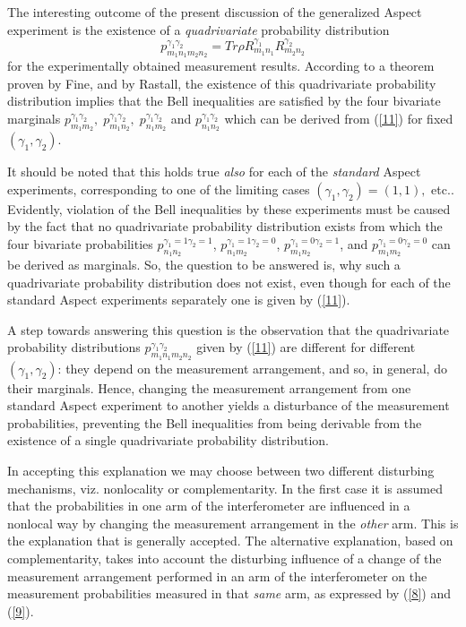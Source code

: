 \documentclass[12pt]{article}
\begin{document}
{The interesting outcome of the present discussion of the
generalized Aspect experiment is the existence of a
\textit{quadrivariate} probability distribution
 \begin{equation}\label{11}p^{\gamma_1\gamma_2}_{{m}_{\!1}
{n}_{\!1} {m}_{2} {n}_{2}} = Tr \rho R^{\gamma_1}_{{m}_{\!1}
n_{\!1}}
 {R}^{\gamma_2}_{ {m}_{2} {n}_{2}}
\end{equation}
for the experimentally obtained measurement results. According to
a theorem proven by Fine\cite{Fine}, and by Rastall\cite{Ras83},
the existence of this quadrivariate probability distribution
implies that the Bell inequalities are satisfied by the four
bivariate marginals $p^{\gamma_1\gamma_2}_{{m}_{\!1} {m}_{2}},\;
p^{\gamma_1\gamma_2}_{{m}_{\!1}  {n}_{2}},\;
p^{\gamma_1\gamma_2}_{{n}_{\!1} {m}_{2}}$ and
$p^{\gamma_1\gamma_2}_{{n}_{\!1}  {n}_{2}}$ which can be derived
from (\ref{11}) for fixed $(\gamma_1,\gamma_2)$.

It should be noted that this holds true \textit{also} for each of
the \textit{standard} Aspect experiments, corresponding to one of
the limiting cases $(\gamma_1, \gamma_2)=(1,1),$ etc.. Evidently,
violation of the Bell inequalities by these experiments must be
caused by the fact that no quadrivariate probability distribution
exists from which the four bivariate probabilities
$p^{\gamma_1=1\gamma_2=1}_{{n}_{\!1} {n}_{2}}$,
$p^{\gamma_1=1\gamma_2=0}_{{n}_{\!1} {m}_{2}}$,
$p^{\gamma_1=0\gamma_2=1}_{{m}_{\!1} {n}_{2}}$,
 and $p^{\gamma_1=0\gamma_2=0}_{{m}_{\!1} {m}_{2}}$
 can be derived as marginals. So, the question to be answered is,
 why such a quadrivariate probability distribution does not exist,
 even though for each of the standard Aspect experiments separately
 one is given by (\ref{11}).

A step towards answering this question is the observation that the
quadrivariate probability distributions
$p^{\gamma_1\gamma_2}_{{m}_{\!1} {n}_{\!1} {m}_{2} {n}_{2}}$ given
by (\ref{11}) are different for different $(\gamma_1,\gamma_2)$:
they depend on the measurement arrangement, and so, in general, do
their marginals. Hence, changing the measurement arrangement from
one standard Aspect experiment to another yields a disturbance of
the measurement probabilities, preventing the Bell inequalities
from being derivable from the existence of a single quadrivariate
probability distribution.

In accepting this explanation we may choose between two different
disturbing mechanisms, viz. nonlocality or complementarity. In the
first case it is assumed that the probabilities in one arm of the
interferometer are influenced in a nonlocal way by changing the
measurement arrangement in the \textit{other} arm. This is the
explanation that is generally accepted. The alternative
explanation, based on complementarity, takes into account the
disturbing influence of a change of the measurement arrangement
performed in an arm of the interferometer on the measurement
probabilities measured in that \textit{same} arm, as expressed by
(\ref{8}) and (\ref{9}).

}
\end{document}
